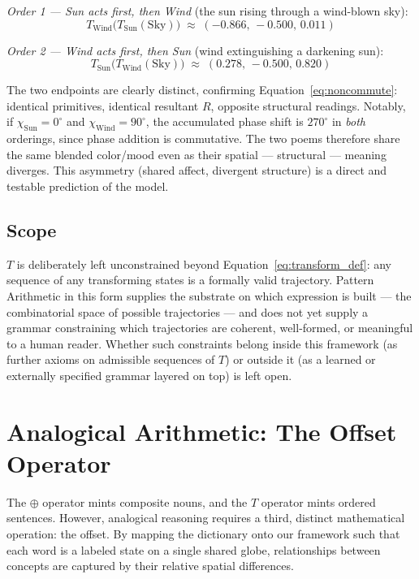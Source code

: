 \documentclass[12pt, a4paper]{article}
\begin{document}
\emph{Order 1 --- Sun acts first, then Wind} (the sun rising through a
wind-blown sky):
\begin{equation}
    T_{\text{Wind}}\big(T_{\text{Sun}}(\text{Sky})\big) \;\approx\; (-0.866,\, -0.500,\, 0.011)
\end{equation}

\emph{Order 2 --- Wind acts first, then Sun} (wind extinguishing a
darkening sun):
\begin{equation}
    T_{\text{Sun}}\big(T_{\text{Wind}}(\text{Sky})\big) \;\approx\; (0.278,\, -0.500,\, 0.820)
\end{equation}

The two endpoints are clearly distinct, confirming
Equation~\eqref{eq:noncommute}: identical primitives, identical
resultant $R$, opposite structural readings. Notably, if $\chi_{\text{Sun}}
= 0^\circ$ and $\chi_{\text{Wind}} = 90^\circ$, the accumulated phase
shift is $270^\circ$ in \emph{both} orderings, since phase addition is
commutative. The two poems therefore share the same blended color/mood
even as their spatial --- structural --- meaning diverges. This
asymmetry (shared affect, divergent structure) is a direct and
testable prediction of the model.

\subsection{Scope}
\label{subsec:transform_scope}
$T$ is deliberately left unconstrained beyond
Equation~\eqref{eq:transform_def}: any sequence of any transforming
states is a formally valid trajectory. Pattern Arithmetic in this form
supplies the substrate on which expression is built --- the
combinatorial space of possible trajectories --- and does not yet
supply a grammar constraining which trajectories are coherent,
well-formed, or meaningful to a human reader. Whether such constraints
belong inside this framework (as further axioms on admissible
sequences of $T$) or outside it (as a learned or externally specified
grammar layered on top) is left open.

\section{Analogical Arithmetic: The Offset Operator}
\label{sec:analogical_offset}

The $\oplus$ operator mints composite nouns, and the $T$ operator mints ordered sentences. However, analogical reasoning requires a third, distinct mathematical operation: the offset. By mapping the dictionary onto our framework such that each word is a labeled state on a single shared globe, relationships between concepts are captured by their relative spatial differences.
\end{document}
